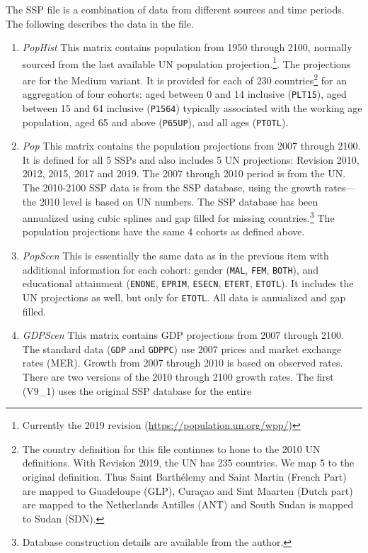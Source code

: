 The SSP file is a combination of data from different sources and time
periods. The following describes the data in the file.
\begin{enumerate}
\item \emph{PopHist} This matrix contains population from 1950 through 2100,
normally sourced from the last available UN population projection.\footnote{Currently
the 2019 revision (\url{https://population.un.org/wpp/})}. The projections are
for the Medium variant. It is provided for each of
230 countries\footnote{The country definition for this file continues to hone
to the 2010 UN definitions. With Revision 2019, the UN has 235 countries. We map
5 to the original definition. Thus Saint {Barth\'elemy} and Saint Martin
(French Part) are mapped to Guadeloupe (GLP), {Cura\c{c}ao} and Sint Maarten (Dutch part)
are mapped to the Netherlands Antilles (ANT) and South Sudan is mapped to Sudan (SDN).}
for an aggregation of four cohorts: aged between 0 and 14 inclusive (\texttt{PLT15}),
aged between 15 and 64 inclusive (\texttt{P1564}) typically associated with the
working age population, aged 65 and above (\texttt{P65UP}), and all ages (\texttt{PTOTL}).
\item \emph{Pop} This matrix contains the population projections
from 2007 through 2100. It is defined for all 5 SSPs and also
includes 5 UN projections: Revision 2010, 2012, 2015, 2017 and 2019.
The 2007 through 2010 period is from the UN. The 2010-2100 SSP data
is from the SSP database, using the growth rates---the 2010 level
is based on UN numbers. The SSP database has been annualized using
cubic splines and gap filled for missing countries.\footnote{Database
construction details are available from the author.} The population
projections have the same 4 cohorts as defined above.
\item \emph{PopScen} This is essentially the same data as in the
previous item with additional information for each cohort: gender (\texttt{MAL}, \texttt{FEM},
\texttt{BOTH}), and educational attainment (\texttt{ENONE}, \texttt{EPRIM}, \texttt{ESECN}, \texttt{ETERT}, \texttt{ETOTL}).
It includes the UN projections as well, but only for \texttt{ETOTL}.
All data is annualized and gap filled.
\item \emph{GDPScen} This matrix contains GDP projections from 2007 through
2100. The standard data (\texttt{GDP} and \texttt{GDPPC}) use 2007
prices and market exchange rates (MER). Growth from 2007 through 2010
is based on observed rates. There are two versions of the 2010 through 2100
growth rates. The first (V9\_1) uses the original SSP database for the entire

\end{enumerate}
